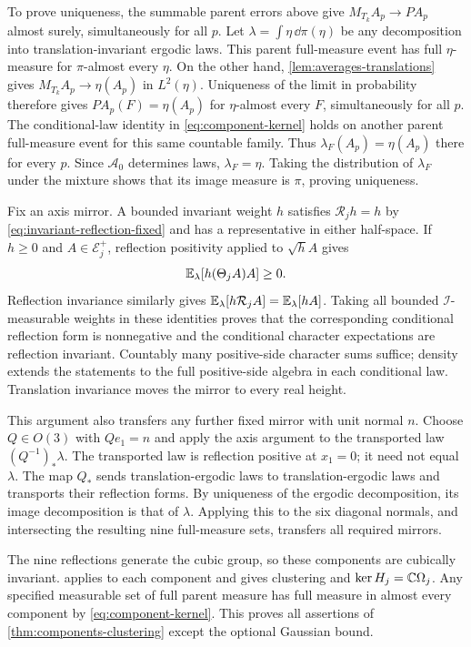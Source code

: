 To prove uniqueness, the summable parent errors above give
$M_{T_k}A_p\to PA_p$ almost surely, simultaneously for all $p$.
Let $\lambda=\int\eta\,\dd\pi(\eta)$ be any decomposition into
translation-invariant ergodic laws. This parent full-measure event
has full $\eta$-measure for $\pi$-almost every $\eta$.
On the other hand, \cref{lem:averages-translations} gives
$M_{T_k}A_p\to\eta(A_p)$ in $L^2(\eta)$.
Uniqueness of the limit in probability therefore gives
$PA_p(F)=\eta(A_p)$ for $\eta$-almost every $F$, simultaneously
for all $p$. The conditional-law identity in
\eqref{eq:component-kernel} holds on another parent full-measure
event for this same countable family. Thus
$\lambda_F(A_p)=\eta(A_p)$ there for every $p$.
Since $\mathcal A_0$ determines laws, $\lambda_F=\eta$.
Taking the distribution of $\lambda_F$ under the mixture shows
that its image measure is $\pi$, proving uniqueness.

Fix an axis mirror. A bounded invariant weight $h$ satisfies
$\mathcal R_jh=h$ by \eqref{eq:invariant-reflection-fixed} and has a
representative in either half-space. If $h\ge0$ and
$A\in\mathcal E_j^+$, reflection positivity applied to $\sqrt hA$
gives
\begin{equation}\label{eq:weighted-component-rp}
 \mathbb E_\lambda[h(\Theta_jA)A]\ge0.
\end{equation}
Reflection invariance similarly gives
$\mathbb E_\lambda[h\mathcal R_jA]=\mathbb E_\lambda[hA]$.
Taking all bounded $\mathcal I$-measurable weights in these identities
proves that the corresponding conditional reflection form is
nonnegative and the conditional character expectations are reflection
invariant. Countably many positive-side character sums suffice;
density extends the statements to the full positive-side algebra
in each conditional law. Translation invariance moves the mirror
to every real height.

This argument also transfers any further fixed mirror with unit normal $n$.
Choose $Q\in O(3)$ with $Qe_1=n$ and apply the axis argument to
the transported law $(Q^{-1})_*\lambda$. The transported law is
reflection positive at $x_1=0$; it need not equal $\lambda$.
The map $Q_*$ sends translation-ergodic laws to translation-ergodic
laws and transports their reflection forms. By uniqueness of the
ergodic decomposition, its image decomposition is that of $\lambda$.
Applying this to the six diagonal normals, and intersecting the
resulting nine full-measure sets, transfers all required mirrors.

The nine reflections generate the cubic group, so these components
are cubically invariant.  applies
to each component and gives clustering and
$\ker H_j=\mathbb C\Omega_j$. Any specified measurable set of full parent
measure has full measure in almost every component by
\eqref{eq:component-kernel}. This proves all assertions of
\cref{thm:components-clustering} except the optional Gaussian bound.

